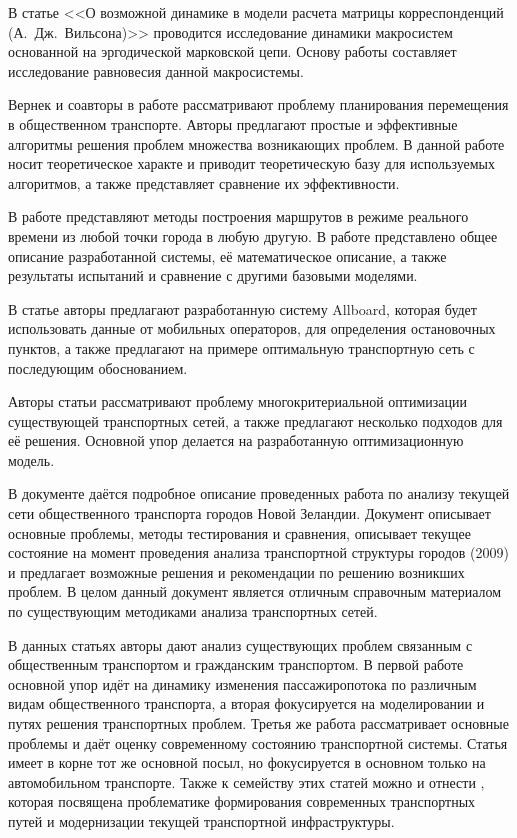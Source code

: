 В статье <<О возможной динамике в модели расчета матрицы корреспонденций (А.~Дж.~Вильсона)>>\cite{bib:24} 
проводится исследование динамики макросистем основанной на эргодической марковской цепи. Основу работы 
составляет исследование равновесия данной макросистемы.

Вернек и соавторы в работе \cite{bib:25} рассматривают проблему планирования перемещения в общественном 
транспорте. Авторы предлагают простые и эффективные алгоритмы решения проблем множества возникающих проблем.
В данной работе носит теоретическое характе и приводит теоретическую базу для используемых алгоритмов, а 
также представляет сравнение их эффективности.

В работе \cite{bib:27} представляют методы построения маршрутов в режиме реального времени из любой точки 
города в любую другую. В работе представлено общее описание разработанной системы, её математическое 
описание, а также результаты испытаний и сравнение с другими базовыми моделями.

В статье \cite{bib:28} авторы предлагают разработанную систему Allboard, которая будет использовать данные 
от мобильных операторов, для определения остановочных пунктов, а также предлагают на примере оптимальную 
транспортную сеть с последующим обоснованием. 

Авторы статьи \cite{bib:29} рассматривают проблему многокритериальной оптимизации существующей транспортных 
сетей, а также предлагают несколько подходов для её решения. Основной упор делается на разработанную 
оптимизационную модель.

В документе \cite{bib:30} даётся подробное описание проведенных работа по анализу текущей сети общественного 
транспорта городов Новой Зеландии. Документ описывает основные проблемы, методы тестирования и сравнения, 
описывает текущее состояние на момент проведения анализа транспортной структуры городов (2009) и предлагает 
возможные решения и рекомендации по решению возникших проблем. В целом данный документ является отличным 
справочным материалом по существующим методиками анализа транспортных сетей.

В данных статьях \cite{bib:31,bib:32,bib:34} авторы дают анализ существующих проблем связанным с 
общественным транспортом и гражданским транспортом. В первой работе основной упор идёт на динамику изменения 
пассажиропотока по различным видам общественного транспорта, а вторая фокусируется на моделировании и 
путях решения транспортных проблем. Третья же работа рассматривает основные проблемы и даёт оценку 
современному состоянию транспортной системы. Статья \cite{bib:39} имеет в корне тот же основной 
посыл, но фокусируется в основном только на автомобильном транспорте. Также к семейству этих статей можно и 
отнести \cite{bib:40}, которая посвящена проблематике формирования современных транспортных путей и 
модернизации текущей транспортной инфраструктуры.

